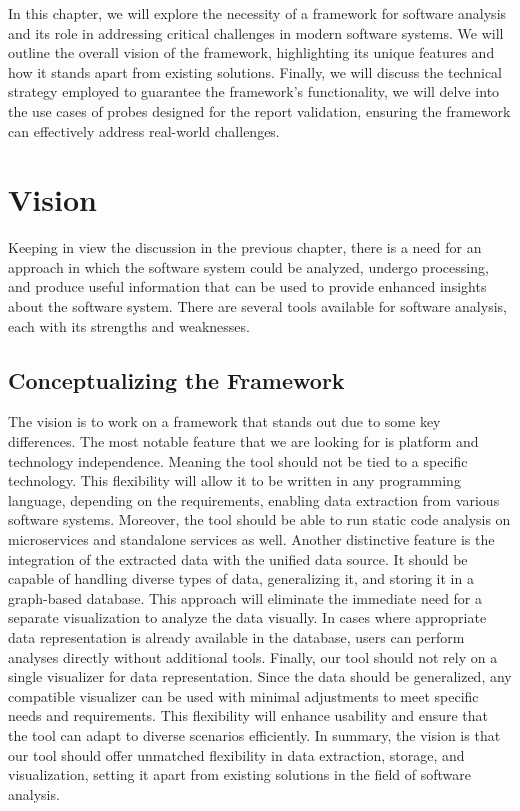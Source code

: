In this chapter, we will explore the necessity of a framework for software analysis and its role in addressing critical challenges in modern software systems. We will outline the overall vision of the framework, highlighting its unique features and how it stands apart from existing solutions. Finally, we will discuss the technical strategy employed to guarantee the framework's functionality, we will delve into the use cases of probes designed for the report validation, ensuring the framework can effectively address real-world challenges.

\section{Vision}\label{sec:vision}

Keeping in view the discussion in the previous chapter, there is a need for an approach in which the software system could be analyzed, undergo processing, and produce useful information that can be used to provide enhanced insights about the software system. There are several tools available for software analysis, each with its strengths and weaknesses. 

\subsection{Conceptualizing the Framework}
The vision is to work on a framework that stands out due to some key differences. The most notable feature that we are looking for is platform and technology independence. Meaning the tool should not be tied to a specific technology. This flexibility will allow it to be written in any programming language, depending on the requirements, enabling data extraction from various software systems. Moreover, the tool should be able to run static code analysis on microservices and standalone services as well. Another distinctive feature is the integration of the extracted data with the unified data source. It should be capable of handling diverse types of data, generalizing it, and storing it in a graph-based database. This approach will eliminate the immediate need for a separate visualization to analyze the data visually. In cases where appropriate data representation is already available in the database, users can perform analyses directly without additional tools. Finally, our tool should not rely on a single visualizer for data representation. Since the data should be generalized, any compatible visualizer can be used with minimal adjustments to meet specific needs and requirements. This flexibility will enhance usability and ensure that the tool can adapt to diverse scenarios efficiently. In summary, the vision is that our tool should offer unmatched flexibility in data extraction, storage, and visualization, setting it apart from existing solutions in the field of software analysis.

